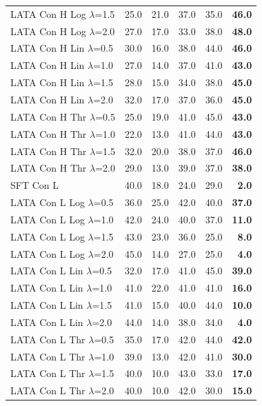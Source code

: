 \begin{longtable}{lrrrrr}
LATA Con H Log $\lambda$=1.5 & 25.0 & 21.0 & 37.0 & 35.0 & \textbf{46.0} \\
LATA Con H Log $\lambda$=2.0 & 27.0 & 17.0 & 33.0 & 38.0 & \textbf{48.0} \\
LATA Con H Lin $\lambda$=0.5 & 30.0 & 16.0 & 38.0 & 44.0 & \textbf{46.0} \\
LATA Con H Lin $\lambda$=1.0 & 27.0 & 14.0 & 37.0 & 41.0 & \textbf{43.0} \\
LATA Con H Lin $\lambda$=1.5 & 28.0 & 15.0 & 34.0 & 38.0 & \textbf{45.0} \\
LATA Con H Lin $\lambda$=2.0 & 32.0 & 17.0 & 37.0 & 36.0 & \textbf{45.0} \\
LATA Con H Thr $\lambda$=0.5 & 25.0 & 19.0 & 41.0 & 45.0 & \textbf{43.0} \\
LATA Con H Thr $\lambda$=1.0 & 22.0 & 13.0 & 41.0 & 44.0 & \textbf{43.0} \\
LATA Con H Thr $\lambda$=1.5 & 32.0 & 20.0 & 38.0 & 37.0 & \textbf{46.0} \\
LATA Con H Thr $\lambda$=2.0 & 29.0 & 13.0 & 39.0 & 37.0 & \textbf{38.0} \\
SFT Con L & 40.0 & 18.0 & 24.0 & 29.0 & \textbf{2.0} \\
LATA Con L Log $\lambda$=0.5 & 36.0 & 25.0 & 42.0 & 40.0 & \textbf{37.0} \\
LATA Con L Log $\lambda$=1.0 & 42.0 & 24.0 & 40.0 & 37.0 & \textbf{11.0} \\
LATA Con L Log $\lambda$=1.5 & 43.0 & 23.0 & 36.0 & 25.0 & \textbf{8.0} \\
LATA Con L Log $\lambda$=2.0 & 45.0 & 14.0 & 27.0 & 25.0 & \textbf{4.0} \\
LATA Con L Lin $\lambda$=0.5 & 32.0 & 17.0 & 41.0 & 45.0 & \textbf{39.0} \\
LATA Con L Lin $\lambda$=1.0 & 41.0 & 22.0 & 41.0 & 41.0 & \textbf{16.0} \\
LATA Con L Lin $\lambda$=1.5 & 41.0 & 15.0 & 40.0 & 44.0 & \textbf{10.0} \\
LATA Con L Lin $\lambda$=2.0 & 44.0 & 14.0 & 38.0 & 34.0 & \textbf{4.0} \\
LATA Con L Thr $\lambda$=0.5 & 35.0 & 17.0 & 42.0 & 44.0 & \textbf{42.0} \\
LATA Con L Thr $\lambda$=1.0 & 39.0 & 13.0 & 42.0 & 41.0 & \textbf{30.0} \\
LATA Con L Thr $\lambda$=1.5 & 40.0 & 10.0 & 43.0 & 33.0 & \textbf{17.0} \\
LATA Con L Thr $\lambda$=2.0 & 40.0 & 10.0 & 42.0 & 30.0 & \textbf{15.0} \\
\end{longtable}

